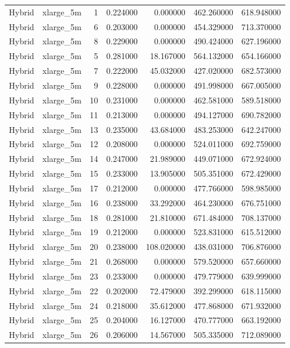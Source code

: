 \begin{tabular}{llrrrrr}
Hybrid & xlarge_5m & 1 & 0.224000 & 0.000000 & 462.260000 & 618.948000 \\
Hybrid & xlarge_5m & 6 & 0.203000 & 0.000000 & 454.329000 & 713.370000 \\
Hybrid & xlarge_5m & 8 & 0.229000 & 0.000000 & 490.424000 & 627.196000 \\
Hybrid & xlarge_5m & 5 & 0.281000 & 18.167000 & 564.132000 & 654.166000 \\
Hybrid & xlarge_5m & 7 & 0.222000 & 45.032000 & 427.020000 & 682.573000 \\
Hybrid & xlarge_5m & 9 & 0.228000 & 0.000000 & 491.998000 & 667.005000 \\
Hybrid & xlarge_5m & 10 & 0.231000 & 0.000000 & 462.581000 & 589.518000 \\
Hybrid & xlarge_5m & 11 & 0.213000 & 0.000000 & 494.127000 & 690.782000 \\
Hybrid & xlarge_5m & 13 & 0.235000 & 43.684000 & 483.253000 & 642.247000 \\
Hybrid & xlarge_5m & 12 & 0.208000 & 0.000000 & 524.011000 & 692.759000 \\
Hybrid & xlarge_5m & 14 & 0.247000 & 21.989000 & 449.071000 & 672.924000 \\
Hybrid & xlarge_5m & 15 & 0.233000 & 13.905000 & 505.351000 & 672.429000 \\
Hybrid & xlarge_5m & 17 & 0.212000 & 0.000000 & 477.766000 & 598.985000 \\
Hybrid & xlarge_5m & 16 & 0.238000 & 33.292000 & 464.230000 & 676.751000 \\
Hybrid & xlarge_5m & 18 & 0.281000 & 21.810000 & 671.484000 & 708.137000 \\
Hybrid & xlarge_5m & 19 & 0.212000 & 0.000000 & 523.831000 & 615.512000 \\
Hybrid & xlarge_5m & 20 & 0.238000 & 108.020000 & 438.031000 & 706.876000 \\
Hybrid & xlarge_5m & 21 & 0.268000 & 0.000000 & 579.520000 & 657.660000 \\
Hybrid & xlarge_5m & 23 & 0.233000 & 0.000000 & 479.779000 & 639.999000 \\
Hybrid & xlarge_5m & 22 & 0.202000 & 72.479000 & 392.299000 & 618.115000 \\
Hybrid & xlarge_5m & 24 & 0.218000 & 35.612000 & 477.868000 & 671.932000 \\
Hybrid & xlarge_5m & 25 & 0.204000 & 16.127000 & 470.777000 & 663.192000 \\
Hybrid & xlarge_5m & 26 & 0.206000 & 14.567000 & 505.335000 & 712.089000 \\

\end{tabular}
